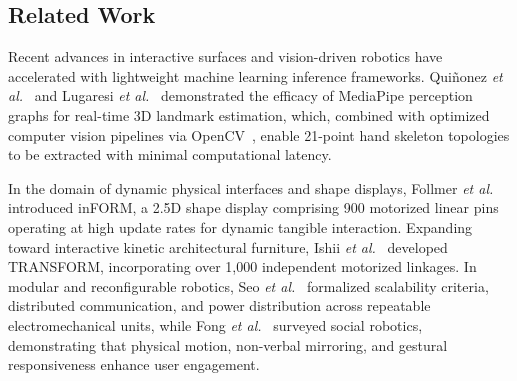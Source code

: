 \documentclass[lettersize,journal]{IEEEtran}
\begin{document}
	\subsection{Related Work}
	\label{sec:related_work}
	
	Recent advances in interactive surfaces and vision-driven robotics have accelerated with lightweight machine learning inference frameworks. Qui{\~n}onez \textit{et al.}~\cite{quinonez2022mediapipe} and Lugaresi \textit{et al.}~\cite{lugaresi2019mediapipe} demonstrated the efficacy of MediaPipe perception graphs for real-time 3D landmark estimation, which, combined with optimized computer vision pipelines via OpenCV~\cite{bradski2000opencv}, enable 21-point hand skeleton topologies to be extracted with minimal computational latency.
	
	In the domain of dynamic physical interfaces and shape displays, Follmer \textit{et al.}~\cite{follmer2013inform} introduced inFORM, a 2.5D shape display comprising 900 motorized linear pins operating at high update rates for dynamic tangible interaction. Expanding toward interactive kinetic architectural furniture, Ishii \textit{et al.}~\cite{ishii2015transform} developed TRANSFORM, incorporating over 1,000 independent motorized linkages. In modular and reconfigurable robotics, Seo \textit{et al.}~\cite{seo2019modular} formalized scalability criteria, distributed communication, and power distribution across repeatable electromechanical units, while Fong \textit{et al.}~\cite{fong2003social} surveyed social robotics, demonstrating that physical motion, non-verbal mirroring, and gestural responsiveness enhance user engagement.
	
\end{document}
